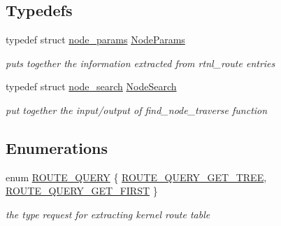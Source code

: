 \subsection*{Typedefs}
\begin{DoxyCompactItemize}
\item 
typedef struct \hyperlink{structnode__params}{node\+\_\+params} \hyperlink{route-tree_8c_a3aa763b62cd1d285ed35bb7f0fe4d149}{Node\+Params}
\begin{DoxyCompactList}\small\item\em puts together the information extracted from rtnl\+\_\+route entries \end{DoxyCompactList}\item 
typedef struct \hyperlink{structnode__search}{node\+\_\+search} \hyperlink{route-tree_8c_a26d9b840f9226a0ce349b00950ea0bdc}{Node\+Search}
\begin{DoxyCompactList}\small\item\em put together the input/output of find\+\_\+node\+\_\+traverse function \end{DoxyCompactList}\end{DoxyCompactItemize}
\subsection*{Enumerations}
\begin{DoxyCompactItemize}
\item 
enum \hyperlink{route-tree_8c_aed8cdbb52dbe32c343a8c26887888e7f}{R\+O\+U\+T\+E\+\_\+\+Q\+U\+E\+RY} \{ \hyperlink{route-tree_8c_aed8cdbb52dbe32c343a8c26887888e7fab02d9a33d5a8476efc87ecc7049cc120}{R\+O\+U\+T\+E\+\_\+\+Q\+U\+E\+R\+Y\+\_\+\+G\+E\+T\+\_\+\+T\+R\+EE}, 
\hyperlink{route-tree_8c_aed8cdbb52dbe32c343a8c26887888e7fae1f920d24672bfd2b4deee446627d969}{R\+O\+U\+T\+E\+\_\+\+Q\+U\+E\+R\+Y\+\_\+\+G\+E\+T\+\_\+\+F\+I\+R\+ST}
 \}\begin{DoxyCompactList}\small\item\em the type request for extracting kernel route table \end{DoxyCompactList}
\end{DoxyCompactItemize}
